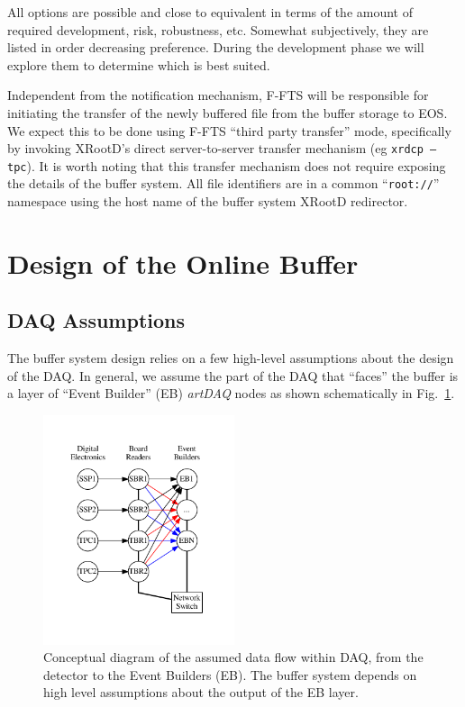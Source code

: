 \documentclass[pdftex,12pt,letter]{article}
\newcommand{\xrd}{XRootD\xspace}
\begin{document}
All options are possible and close to equivalent in terms of the
amount of required development, risk, robustness, etc.  Somewhat
subjectively, they are listed in order decreasing preference.  During
the development phase we will explore them to determine which is best
suited.

Independent from the notification mechanism, F-FTS will be responsible
for initiating the transfer of the newly buffered file from the buffer
storage to EOS.  We expect this to be done using F-FTS ``third party
transfer'' mode, specifically by invoking \xrd's direct
server-to-server transfer mechanism (eg \texttt{xrdcp --tpc}).  It is
worth noting that this transfer mechanism does not require exposing
the details of the buffer system.  All file identifiers are in a
common ``\texttt{root://}'' namespace using the host name of the
buffer system \xrd redirector.  

\section{Design of the Online Buffer}

\subsection{DAQ Assumptions}

The buffer system design relies on a few high-level assumptions about
the design of the DAQ.  In general, we assume the part of the DAQ that
``faces'' the buffer is a layer of ``Event Builder'' (EB) \textit{artDAQ}
nodes as shown schematically in Fig.~\ref{fig:upstream}.

\begin{figure}[tbh]
  \centering
  \includegraphics[width=0.5\textwidth]{figures/upstream.pdf}
  \caption{Conceptual diagram of the assumed data flow within DAQ, from the detector to the Event Builders (EB).  The buffer system depends on high level assumptions about the output of the EB layer.}
  \label{fig:upstream}
\end{figure}
\end{document}
